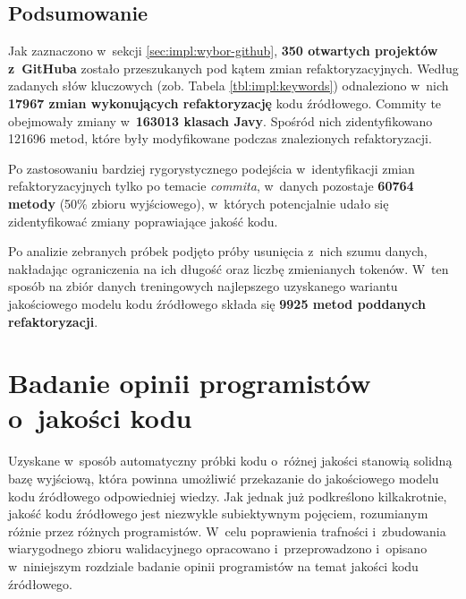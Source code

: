 \documentclass[twoside]{praca}
\begin{document}
\pagebreak
\section{Podsumowanie}
\label{sec:impl:results}

Jak zaznaczono w~sekcji \ref{sec:impl:wybor-github}, \textbf{350 otwartych projektów z~GitHuba} zostało przeszukanych pod kątem zmian refaktoryzacyjnych. Według zadanych słów kluczowych (zob. Tabela \ref{tbl:impl:keywords}) odnaleziono w~nich \textbf{17967 zmian wykonujących refaktoryzację} kodu źródłowego. Commity te obejmowały zmiany w~\textbf{163013 klasach Javy}. Spośród nich zidentyfikowano 121696 metod, które były modyfikowane podczas znalezionych refaktoryzacji.

Po zastosowaniu bardziej rygorystycznego podejścia w~identyfikacji zmian refaktoryzacyjnych tylko po temacie \textit{commita}, w~danych pozostaje \textbf{60764 metody} (50\% zbioru wyjściowego), w~których potencjalnie udało się zidentyfikować zmiany poprawiające jakość kodu.

Po analizie zebranych próbek podjęto próby usunięcia z~nich szumu danych, nakładając ograniczenia na ich długość oraz liczbę zmienianych tokenów. W~ten sposób na zbiór danych treningowych najlepszego uzyskanego wariantu jakościowego modelu kodu źródłowego składa się \textbf{9925 metod poddanych refaktoryzacji}. 



\cleardoublepage
\chapter{Badanie opinii programistów o~jakości kodu}
\label{ch:codefracz}

\begin{addmargin}{1cm}
Uzyskane w~sposób automatyczny próbki kodu o~różnej jakości stanowią solidną bazę wyjściową, która powinna umożliwić przekazanie do jakościowego modelu kodu źródłowego odpowiedniej wiedzy. Jak jednak już podkreślono kilkakrotnie, jakość kodu źródłowego jest niezwykle subiektywnym pojęciem, rozumianym różnie przez różnych programistów. W~celu poprawienia trafności i~zbudowania wiarygodnego zbioru walidacyjnego opracowano i~przeprowadzono i~opisano w~niniejszym rozdziale badanie opinii programistów na temat jakości kodu źródłowego. 
\end{addmargin}
\end{document}

